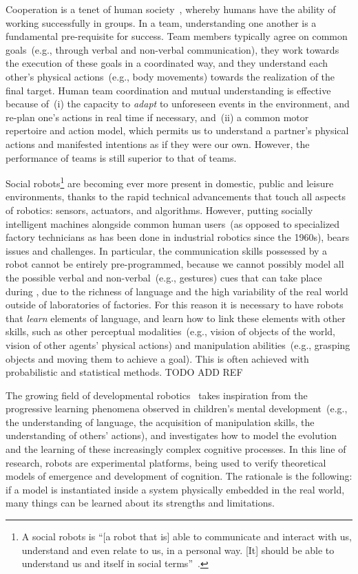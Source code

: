 Cooperation is a tenet of human society~\cite{turner:1975}, whereby humans have the ability of working successfully in groups.
In a team, understanding one another is a fundamental pre-requisite for success.
Team members typically agree on common goals~(e.g., through verbal and non-verbal communication), they work towards the execution of these goals in a coordinated way, and they understand each other's physical actions~(e.g., body movements) towards the realization of the final target.
Human team coordination and mutual understanding is effective~\cite{ramnani:2004:natureneuro} because of~(i) the capacity to \emph{adapt} to unforeseen events in the environment, and re-plan one's actions in real time if necessary, and~(ii) a common motor repertoire and action model, which permits us to understand a partner's physical actions and manifested intentions as if they were our own.
However, the performance of \hh{} teams is still superior to that of \hr{} teams.

Social robots\footnote{A social robots is ``[a robot that is] able to communicate and interact with us, understand and even relate to us, in a personal way. [It] should be able to understand us and itself in social terms''~\cite{breazeal:2002:dsr}.} are becoming ever more present in domestic, public and leisure environments, thanks to the rapid technical advancements that touch all aspects of robotics: sensors, actuators, and algorithms.
However, putting socially intelligent machines alongside common human users~(as opposed to specialized factory technicians as has been done in industrial robotics since the 1960s), bears issues and challenges.
In particular, the communication skills possessed by a robot cannot be entirely pre-programmed, because we cannot possibly model all the possible verbal and non-verbal~(e.g., gestures) cues that can take place during \hri, due to the richness of language and the high variability of the real world outside of laboratories of factories.
For this reason it is necessary to have robots that \emph{learn} elements of language, and learn how to link these elements with other skills, such as other perceptual modalities~(e.g., vision of objects of the world, vision of other agents' physical actions) and manipulation abilities~(e.g., grasping objects and moving them to achieve a goal).
This is often achieved with probabilistic and statistical methods. TODO ADD REF

The growing field of developmental robotics~\cite{lungarella:2003:devrobsurvey,cangelosi:2015:devrobbook} takes inspiration from the progressive learning phenomena observed in children's mental development~(e.g., the understanding of language, the acquisition of manipulation skills, the understanding of others' actions), and investigates how to model the evolution and the learning of these increasingly complex cognitive processes.
In this line of research, robots are experimental platforms, being used to verify theoretical models of emergence and development of cognition.
The rationale is the following: if a model is instantiated inside a system physically embedded in the real world, many things can be learned about its strengths and limitations.

